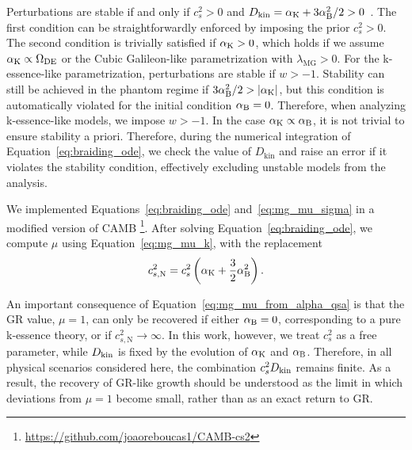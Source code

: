 \documentclass[%
reprint,
superscriptaddress,
preprint numbers,
nofootinbib,
amsmath,amssymb,
aps,
prd
]{revtex4-2}
\begin{document}
Perturbations are stable if and only if $c_s^2 > 0$ and $D_\mathrm{kin} = \alpha_{\rm K} + 3\alpha_{\rm B}^2/2 > 0$~\cite{bellini_sawicky, mg_sims}. The first condition can be straightforwardly enforced by imposing the prior $c_s^2 > 0$. The second condition is trivially satisfied if $\alpha_{\rm K} > 0$, which holds if we assume $\alpha_{\rm K} \propto \Omega_\mathrm{DE}$ or the Cubic Galileon-like parametrization with $\lambda_\mathrm{MG} > 0$. For the k-essence-like parametrization, perturbations are stable if $w > -1$. Stability can still be achieved in the phantom regime if $3\alpha_{\rm B}^2/2 > |\alpha_{\rm K}|$, but this condition is automatically violated for the initial condition $\alpha_{\rm B} = 0$. Therefore, when analyzing k-essence-like models, we impose $w > -1$. In the case $\alpha_{\rm K} \propto \alpha_{\rm B}$, it is not trivial to ensure stability a priori. Therefore, during the numerical integration of Equation~\ref{eq:braiding_ode}, we check the value of $D_\mathrm{kin}$ and raise an error if it violates the stability condition, effectively excluding unstable models from the analysis. 

We implemented Equations~\ref{eq:braiding_ode} and~\ref{eq:mg_mu_sigma} in a modified version of CAMB%
\footnote{\url{https://github.com/joaoreboucas1/CAMB-cs2}}.
After solving Equation~\ref{eq:braiding_ode}, we compute $\mu$ using Equation~\ref{eq:mg_mu_k}, with the replacement
\[
c^2_{s,\mathrm{N}} = c_s^2\left(\alpha_{\rm K}+\frac{3}{2}\alpha_{\rm B}^2\right).
\]

An important consequence of Equation~\ref{eq:mg_mu_from_alpha_qsa} is that the GR value, $\mu=1$, can only be recovered if either $\alpha_{\rm B}=0$, corresponding to a pure k-essence theory, or if $c^2_{s,\mathrm{N}}\to\infty$. In this work, however, we treat $c_s^2$ as a free parameter, while $D_{\rm kin}$ is fixed by the evolution of $\alpha_{\rm K}$ and $\alpha_{\rm B}$. Therefore, in all physical scenarios considered here, the combination $c_s^2D_{\rm kin}$ remains finite. As a result, the recovery of GR-like growth should be understood as the limit in which deviations from $\mu=1$ become small, rather than as an exact return to GR.
\end{document}
